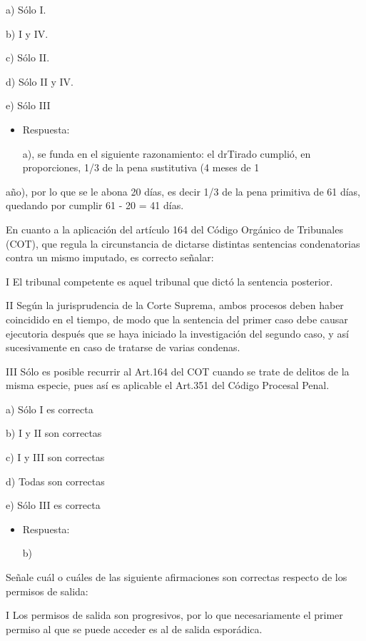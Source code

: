 \documentclass[letterpaper, 11pt]{article}
\begin{document}
a) Sólo I.


b) I y IV.



c) Sólo II.



d) Sólo II y IV.



e) Sólo III


\begin{itemize}
\item Respuesta:

a), se funda en el siguiente razonamiento: el drTirado cumplió, en
proporciones, 1/3 de la pena sustitutiva (4 meses de 1
\end{itemize}
año), por lo que se le abona 20 días, es decir 1/3 de la pena
  primitiva de 61 días, quedando por cumplir 61 - 20 = 41 días.


En cuanto a la aplicación del artículo 164 del Código Orgánico de
Tribunales (COT), que regula la circunstancia de dictarse distintas
sentencias condenatorias contra un mismo imputado, es correcto
señalar:


I El tribunal competente es aquel tribunal que dictó la sentencia
posterior.

II Según la jurisprudencia de la Corte Suprema, ambos procesos deben
haber coincidido en el tiempo, de modo que la sentencia del primer
caso debe causar ejecutoria después que se haya iniciado la
investigación del segundo caso, y así sucesivamente en caso de
tratarse de varias condenas.

III Sólo es posible recurrir al Art.164 del COT cuando se trate de
delitos de la misma especie, pues así es aplicable el Art.351 del
Código Procesal Penal.

a) Sólo I es correcta

b) I y II son correctas

c) I y III son correctas

d) Todas son correctas

e) Sólo III es correcta

\begin{itemize}
\item Respuesta:

b)
\end{itemize}


Señale cuál o cuáles de las siguiente afirmaciones son correctas
respecto de los permisos de salida:

I Los permisos de salida son progresivos, por lo que necesariamente el
primer permiso al que se puede acceder es al de salida esporádica.
\end{document}
